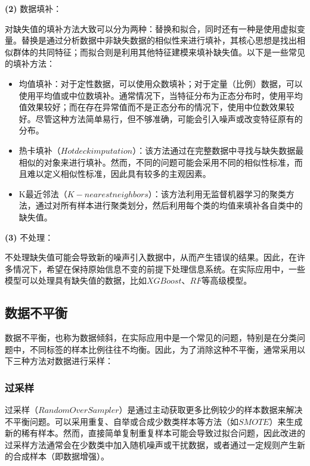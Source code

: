 \documentclass[withoutpreface,bwprint]{cumcmthesis}
\begin{document}
\textbf{(2)} 数据填补：

对缺失值的填补方法大致可以分为两种：替换和拟合，同时还有一种是使用虚拟变量。替换是通过分析数据中非缺失数据的相似性来进行填补，其核心思想是找出相似群体的共同特征；而拟合则是利用其他特征建模来填补缺失值。以下是一些常见的填补方法：

\begin{itemize}
    \item 均值填补：对于定性数据，可以使用众数填补；对于定量（比例）数据，可以使用平均值或中位数填补。通常情况下，当特征分布为正态分布时，使用平均值效果较好；而在存在异常值而不是正态分布的情况下，使用中位数效果较好。尽管这种方法简单易行，但不够准确，可能会引入噪声或改变特征原有的分布。
    
    \item 热卡填补（\(Hot deck imputation\)）：该方法通过在完整数据中寻找与缺失数据最相似的对象来进行填补。然而，不同的问题可能会采用不同的相似性标准，而且难以定义相似性标准，因此具有较多的主观因素。

    \item K最近邻法（\(K-nearest neighbors\)）：该方法利用无监督机器学习的聚类方法，通过对所有样本进行聚类划分，然后利用每个类的均值来填补各自类中的缺失值。
\end{itemize}

\textbf{(3)} 不处理：

不处理缺失值可能会导致新的噪声引入数据中，从而产生错误的结果。因此，在许多情况下，希望在保持原始信息不变的前提下处理信息系统。在实际应用中，一些模型可以处理具有缺失值的数据，比如\(XGBoost\)、\(RF\)等高级模型。


\subsection{数据不平衡}

数据不平衡，也称为数据倾斜，在实际应用中是一个常见的问题，特别是在分类问题中，不同标签的样本比例往往不均衡。因此，为了消除这种不平衡，通常采用以下三种方法对数据进行采样：

\subsubsection{过采样}
过采样（\(RandomOverSampler\)）是通过主动获取更多比例较少的样本数据来解决不平衡问题。可以采用重复、自举或合成少数类样本等方法（如\(SMOTE\)）来生成新的稀有样本。然而，直接简单复制重复样本可能会导致过拟合问题，因此改进的过采样方法通常会在少数类中加入随机噪声或干扰数据，或者通过一定规则产生新的合成样本（即数据增强）。
\end{document}
